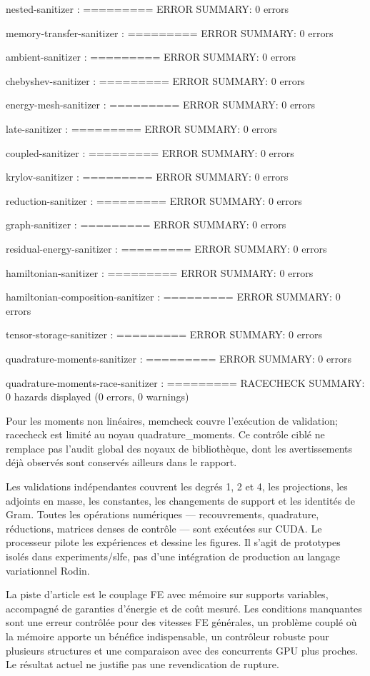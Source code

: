 \documentclass[10pt,a4paper]{article}
\begin{document}
nested-sanitizer : ========= ERROR SUMMARY: 0 errors

memory-transfer-sanitizer : ========= ERROR SUMMARY: 0 errors

ambient-sanitizer : ========= ERROR SUMMARY: 0 errors

chebyshev-sanitizer : ========= ERROR SUMMARY: 0 errors

energy-mesh-sanitizer : ========= ERROR SUMMARY: 0 errors

late-sanitizer : ========= ERROR SUMMARY: 0 errors

coupled-sanitizer : ========= ERROR SUMMARY: 0 errors

krylov-sanitizer : ========= ERROR SUMMARY: 0 errors

reduction-sanitizer : ========= ERROR SUMMARY: 0 errors

graph-sanitizer : ========= ERROR SUMMARY: 0 errors

residual-energy-sanitizer : ========= ERROR SUMMARY: 0 errors

hamiltonian-sanitizer : ========= ERROR SUMMARY: 0 errors

hamiltonian-composition-sanitizer : ========= ERROR SUMMARY: 0 errors

tensor-storage-sanitizer : ========= ERROR SUMMARY: 0 errors

quadrature-moments-sanitizer : ========= ERROR SUMMARY: 0 errors

quadrature-moments-race-sanitizer : ========= RACECHECK SUMMARY: 0 hazards displayed (0 errors, 0 warnings)

Pour les moments non linéaires, memcheck couvre l'exécution de validation; racecheck est limité au noyau quadrature\_moments. Ce contrôle ciblé ne remplace pas l'audit global des noyaux de bibliothèque, dont les avertissements déjà observés sont conservés ailleurs dans le rapport.

Les validations indépendantes couvrent les degrés 1, 2 et 4, les projections, les adjoints en masse, les constantes, les changements de support et les identités de Gram. Toutes les opérations numériques — recouvrements, quadrature, réductions, matrices denses de contrôle — sont exécutées sur CUDA. Le processeur pilote les expériences et dessine les figures. Il s'agit de prototypes isolés dans experiments/slfe, pas d'une intégration de production au langage variationnel Rodin.

La piste d'article est le couplage FE avec mémoire sur supports variables, accompagné de garanties d'énergie et de coût mesuré. Les conditions manquantes sont une erreur contrôlée pour des vitesses FE générales, un problème couplé où la mémoire apporte un bénéfice indispensable, un contrôleur robuste pour plusieurs structures et une comparaison avec des concurrents GPU plus proches. Le résultat actuel ne justifie pas une revendication de rupture.
\end{document}
